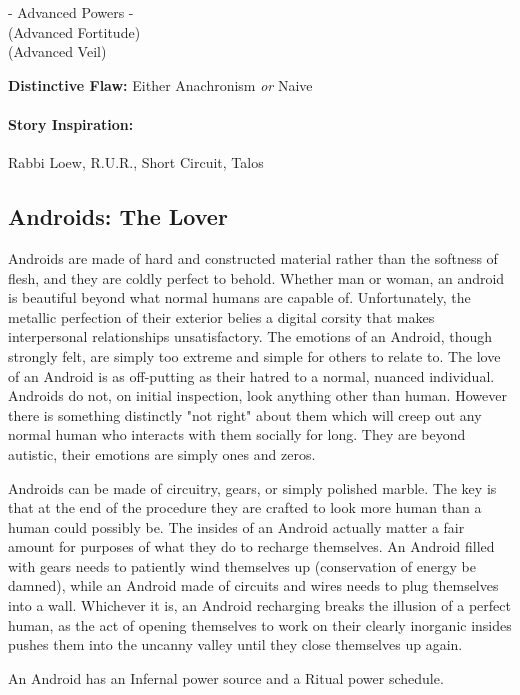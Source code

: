 - Advanced Powers -\\
 (Advanced Fortitude)\\
 (Advanced Veil)

\textbf{Distinctive Flaw:} Either Anachronism \textit{or} Naive

\paragraph{Story Inspiration:} Rabbi Loew, R.U.R., Short Circuit, Talos

\subsection[Androids]{Androids: The Lover} 

Androids are made of hard and constructed material rather than the softness of flesh, and they are coldly perfect to behold. Whether man or woman, an android is beautiful beyond what normal humans are capable of. Unfortunately, the metallic perfection of their exterior belies a digital corsity that makes interpersonal relationships unsatisfactory. The emotions of an Android, though strongly felt, are simply too extreme and simple for others to relate to. The love of an Android is as off-putting as their hatred to a normal, nuanced individual. Androids do not, on initial inspection, look anything other than human. However there is something distinctly "not right" about them which will creep out any normal human who interacts with them socially for long. They are beyond autistic, their emotions are simply ones and zeros.

Androids can be made of circuitry, gears, or simply polished marble. The key is that at the end of the procedure they are crafted to look more human than a human could possibly be. The insides of an Android actually matter a fair amount for purposes of what they do to recharge themselves. An Android filled with gears needs to patiently wind themselves up (conservation of energy be damned), while an Android made of circuits and wires needs to plug themselves into a wall. Whichever it is, an Android recharging breaks the illusion of a perfect human, as the act of opening themselves to work on their clearly inorganic insides pushes them into the uncanny valley until they close themselves up again.

An Android has an Infernal power source and a Ritual power schedule.

